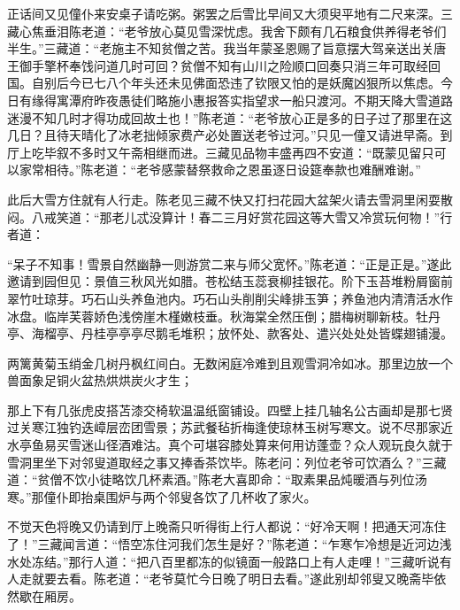 \documentclass[12pt,UTF8]{ctexbook}
\begin{document}
正话间又见僮仆来安桌子请吃粥。粥罢之后雪比早间又大须臾平地有二尺来深。三藏心焦垂泪陈老道：“老爷放心莫见雪深忧虑。我舍下颇有几石粮食供养得老爷们半生。”三藏道：“老施主不知贫僧之苦。我当年蒙圣恩赐了旨意摆大驾亲送出关唐王御手擎杯奉饯问道几时可回？贫僧不知有山川之险顺口回奏只消三年可取经回国。自别后今已七八个年头还未见佛面恐违了钦限又怕的是妖魔凶狠所以焦虑。今日有缘得寓潭府昨夜愚徒们略施小惠报答实指望求一船只渡河。不期天降大雪道路迷漫不知几时才得功成回故土也！”陈老道：“老爷放心正是多的日子过了那里在这几日？且待天晴化了冰老拙倾家费产必处置送老爷过河。”只见一僮又请进早斋。到厅上吃毕叙不多时又午斋相继而进。三藏见品物丰盛再四不安道：“既蒙见留只可以家常相待。”陈老道：“老爷感蒙替祭救命之恩虽逐日设筵奉款也难酬难谢。”

此后大雪方住就有人行走。陈老见三藏不快又打扫花园大盆架火请去雪洞里闲耍散闷。八戒笑道：“那老儿忒没算计！春二三月好赏花园这等大雪又冷赏玩何物！”行者道：

“呆子不知事！雪景自然幽静一则游赏二来与师父宽怀。”陈老道：“正是正是。”遂此邀请到园但见：景值三秋风光如腊。苍松结玉蕊衰柳挂银花。阶下玉苔堆粉屑窗前翠竹吐琼芽。巧石山头养鱼池内。巧石山头削削尖峰排玉笋；养鱼池内清清活水作冰盘。临岸芙蓉娇色浅傍崖木槿嫩枝垂。秋海棠全然压倒；腊梅树聊新枝。牡丹亭、海榴亭、丹桂亭亭亭尽鹅毛堆积；放怀处、款客处、遣兴处处处皆蝶翅铺漫。

两篱黄菊玉绡金几树丹枫红间白。无数闲庭冷难到且观雪洞冷如冰。那里边放一个兽面象足铜火盆热烘烘炭火才生；

那上下有几张虎皮搭苫漆交椅软温温纸窗铺设。四壁上挂几轴名公古画却是那七贤过关寒江独钓迭嶂层峦团雪景；苏武餐毡折梅逢使琼林玉树写寒文。说不尽那家近水亭鱼易买雪迷山径酒难沽。真个可堪容膝处算来何用访蓬壶？众人观玩良久就于雪洞里坐下对邻叟道取经之事又捧香茶饮毕。陈老问：列位老爷可饮酒么？”三藏道：“贫僧不饮小徒略饮几杯素酒。”陈老大喜即命：“取素果品炖暖酒与列位汤寒。”那僮仆即抬桌围炉与两个邻叟各饮了几杯收了家火。

不觉天色将晚又仍请到厅上晚斋只听得街上行人都说：“好冷天啊！把通天河冻住了！”三藏闻言道：“悟空冻住河我们怎生是好？”陈老道：“乍寒乍冷想是近河边浅水处冻结。”那行人道：“把八百里都冻的似镜面一般路口上有人走哩！”三藏听说有人走就要去看。陈老道：“老爷莫忙今日晚了明日去看。”遂此别却邻叟又晚斋毕依然歇在厢房。
\end{document}
